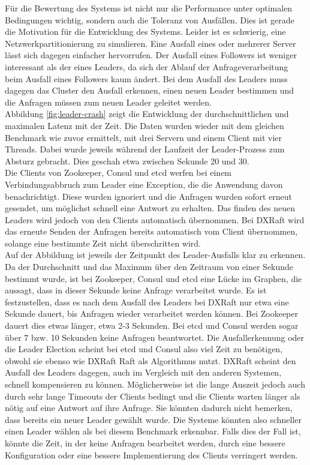 Für die Bewertung des Systems ist nicht nur die Performance unter optimalen Bedingungen wichtig, sondern auch die Toleranz von Ausfällen. Dies ist gerade die Motivation für die Entwicklung des Systems. Leider ist es schwierig, eine Netzwerkpartitionierung zu simulieren. Eine Ausfall eines oder mehrerer Server lässt sich dagegen einfacher hervorrufen. Der Ausfall eines Followers ist weniger interessant als der eines Leaders, da sich der Ablauf der Anfrageverarbeitung beim Ausfall eines Followers kaum ändert. Bei dem Ausfall des Leaders muss dagegen das Cluster den Ausfall erkennen, einen neuen Leader bestimmen und die Anfragen müssen zum neuen Leader geleitet werden. \\
Abbildung \ref{fig:leader-crash} zeigt die Entwicklung der durchschnittlichen und maximalen Latenz mit der Zeit. Die Daten wurden wieder mit dem gleichen Benchmark wie zuvor ermittelt, mit drei Servern und einem Client mit vier Threads. Dabei wurde jeweils während der Laufzeit der Leader-Prozess zum Absturz gebracht. Dies geschah etwa zwischen Sekunde 20 und 30. \\
Die Clients von Zookeeper, Consul und etcd werfen bei einem Verbindungsabbruch zum Leader eine Exception, die die Anwendung davon benachrichtigt. Diese wurden ignoriert und die Anfragen wurden sofort erneut gesendet, um möglichst schnell eine Antwort zu erhalten. Das finden des neuen Leaders wird jedoch von den Clients automatisch übernommen. Bei DXRaft wird das erneute Senden der Anfragen bereits automatisch vom Client übernommen, solange eine bestimmte Zeit nicht überschritten wird. \\
Auf der Abbildung ist jeweils der Zeitpunkt des Leader-Ausfalls klar zu erkennen. Da der Durchschnitt und das Maximum über den Zeitraum von einer Sekunde bestimmt wurde, ist bei Zookeeper, Consul und etcd eine Lücke im Graphen, die aussagt, dass in dieser Sekunde keine Anfrage verarbeitet wurde. Es ist festzustellen, dass es nach dem Ausfall des Leaders bei DXRaft nur etwa eine Sekunde dauert, bis Anfragen wieder verarbeitet werden können. Bei Zookeeper dauert dies etwas länger, etwa 2-3 Sekunden. Bei etcd und Consul werden sogar über 7 bzw. 10 Sekunden keine Anfragen beantwortet. Die Ausfallerkennung oder die Leader Election scheint bei etcd und Consul also viel Zeit zu benötigen, obwohl sie ebenso wie DXRaft Raft als Algorithmus nutzt. DXRaft scheint den Ausfall des Leaders dagegen, auch im Vergleich mit den anderen Systemen, schnell kompensieren zu können. Möglicherweise ist die lange Auszeit jedoch auch durch sehr lange Timeouts der Clients bedingt und die Clients warten länger als nötig auf eine Antwort auf ihre Anfrage. Sie könnten dadurch nicht bemerken, dass bereits ein neuer Leader gewählt wurde. Die Systeme könnten also schneller einen Leader wählen als bei diesem Benchmark erkennbar. Falls dies der Fall ist, könnte die Zeit, in der keine Anfragen bearbeitet werden, durch eine bessere Konfiguration oder eine bessere Implementierung des Clients verringert werden.\\
